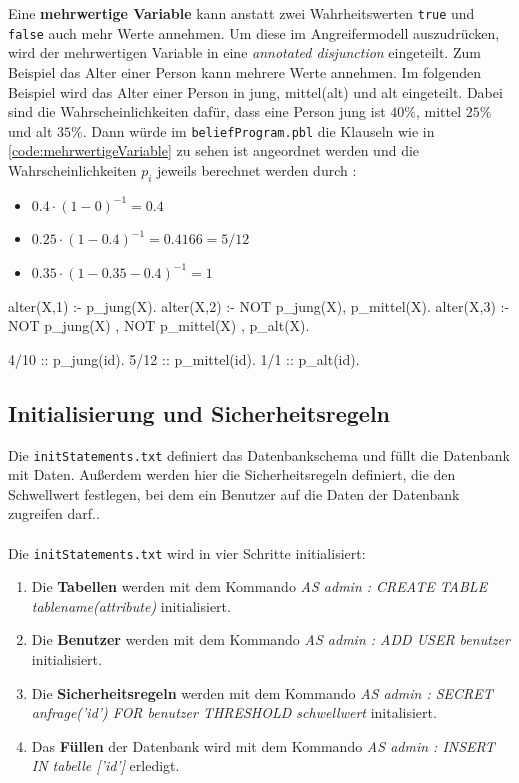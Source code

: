 \documentclass[german,version-2020-11]{uzl-thesis}
\begin{document}
Eine \textbf{mehrwertige Variable} kann anstatt zwei Wahrheitswerten \texttt{true} und \texttt{false} auch mehr Werte annehmen.
Um diese im Angreifermodell auszudrücken, wird der mehrwertigen Variable in eine \textit{annotated disjunction} eingeteilt. Zum Beispiel das Alter einer Person kann mehrere Werte annehmen. Im folgenden Beispiel wird das Alter einer Person in jung, mittel(alt) und alt eingeteilt. Dabei sind die Wahrscheinlichkeiten dafür, dass eine Person jung ist $40\%$, mittel $25\%$ und alt $35\%$. Dann würde im \texttt{beliefProgram.pbl} die Klauseln wie in \autoref{code:mehrwertigeVariable} zu sehen ist angeordnet werden und die Wahrscheinlichkeiten $p_i$ jeweils berechnet werden durch : 
\begin{itemize}
	\item $0.4 \cdot (1- 0)^{-1} = 0.4 $
	\item  $0.25 \cdot (1 - 0.4)^{-1} = 0.4166 = 5/12 $
	\item $ 0.35 \cdot (1 - 0.35 - 0.4)^{-1} = 1 $
\end{itemize}
\begin{Pseudocode}[caption={Beispiel für mehrwertige Variablen}, label={code:mehrwertigeVariable}]
alter(X,1) :- p_jung(X).
alter(X,2) :- NOT p_jung(X), p_mittel(X).
alter(X,3) :- NOT p_jung(X) , NOT p_mittel(X) , p_alt(X).

4/10 :: p_jung(id).
5/12 :: p_mittel(id).
1/1 :: p_alt(id).
\end{Pseudocode} 


\subsection{Initialisierung und Sicherheitsregeln}
Die \texttt{initStatements.txt} definiert das Datenbankschema und füllt die Datenbank mit Daten. Außerdem werden hier die Sicherheitsregeln definiert, die den Schwellwert festlegen, bei dem ein Benutzer auf die Daten der Datenbank zugreifen darf.. \\ \\  
Die \texttt{initStatements.txt} wird in vier Schritte initialisiert:
\begin{enumerate}
	\item Die \textbf{Tabellen } werden mit dem Kommando \textit{AS admin : CREATE TABLE tablename(attribute)} initialisiert. 
	\item  Die \textbf{Benutzer} werden mit dem Kommando \textit{AS admin : ADD USER benutzer} initialisiert. 
	\item Die \textbf{Sicherheitsregeln}  werden mit dem Kommando \textit{AS admin : SECRET anfrage('id') FOR benutzer THRESHOLD schwellwert} initalisiert.
	\item Das \textbf{Füllen} der Datenbank wird mit dem Kommando \textit{AS admin : INSERT IN tabelle ['id']} erledigt.
\end{enumerate} 
\end{document}
